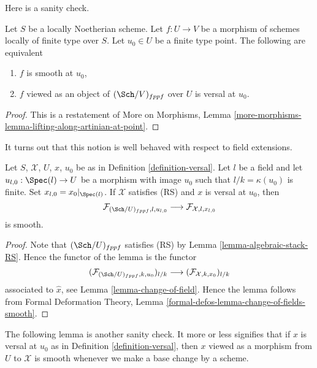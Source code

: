 \noindent
Here is a sanity check.

\begin{lemma}
\label{lemma-versal-implies-smooth}
Let $S$ be a locally Noetherian scheme. Let $f : U \to V$
be a morphism of schemes locally of finite type over $S$.
Let $u_0 \in U$ be a finite type point. The following are equivalent
\begin{enumerate}
\item $f$ is smooth at $u_0$,
\item $f$ viewed as an object of $(\Sch/V)_{fppf}$ over $U$ is
versal at $u_0$.
\end{enumerate}
\end{lemma}

\begin{proof}
This is a restatement of More on Morphisms, Lemma
\ref{more-morphisms-lemma-lifting-along-artinian-at-point}.
\end{proof}

\noindent
It turns out that this notion is well behaved with respect to field
extensions.

\begin{lemma}
\label{lemma-versal-change-of-field}
Let $S$, $\mathcal{X}$, $U$, $x$, $u_0$ be as in
Definition \ref{definition-versal}. Let $l$ be a field and let
$u_{l, 0} : \Spec(l) \to U$ be a morphism with image $u_0$ such that
$l/k = \kappa(u_0)$ is finite. Set $x_{l, 0} = x_0|_{\Spec(l)}$.
If $\mathcal{X}$ satisfies (RS) and $x$ is versal at $u_0$, then
$$
\mathcal{F}_{(\Sch/U)_{fppf}, l, u_{l, 0}}
\longrightarrow
\mathcal{F}_{\mathcal{X}, l, x_{l, 0}}
$$
is smooth.
\end{lemma}

\begin{proof}
Note that $(\Sch/U)_{fppf}$ satisfies (RS) by
Lemma \ref{lemma-algebraic-stack-RS}.
Hence the functor of the lemma is the functor
$$
(\mathcal{F}_{(\Sch/U)_{fppf}, k , u_0})_{l/k}
\longrightarrow
(\mathcal{F}_{\mathcal{X}, k , x_0})_{l/k}
$$
associated to $\hat x$, see Lemma \ref{lemma-change-of-field}.
Hence the lemma follows from
Formal Deformation Theory, Lemma
\ref{formal-defos-lemma-change-of-fields-smooth}.
\end{proof}

\noindent
The following lemma is another sanity check. It more or less
signifies that if $x$ is versal at $u_0$ as in
Definition \ref{definition-versal},
then $x$ viewed as a morphism from $U$ to $\mathcal{X}$ is
smooth whenever we make a base change by a scheme.

